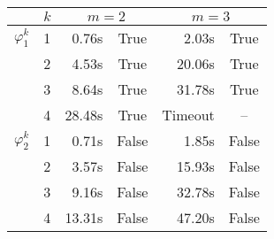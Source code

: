 \begin{table}
\centering
\begin{tabular}{ccrcrc}
  \toprule
  & $k$ & \multicolumn{2}{c}{$m = 2$} & \multicolumn{2}{c}{$m = 3$}  \\\midrule
  $\varphi_1^k$ & 1 &     0.76s & True    &     2.03s & True   \\
               & 2 &     4.53s & True    &    20.06s & True   \\
               & 3 &     8.64s & True    &    31.78s & True   \\
               & 4 &    28.48s & True    &   Timeout & --     \\
  \midrule
  $\varphi_2^k$ & 1 &     0.71s & False   &     1.85s & False  \\
               & 2 &     3.57s & False   &    15.93s & False  \\
               & 3 &     9.16s & False   &    32.78s & False  \\
               & 4 &    13.31s & False   &    47.20s & False  \\

\bottomrule
\end{tabular}
  \label{tab:results}
\end{table}



